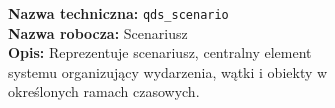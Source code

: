 \begin{figure}[H]
    \begin{minipage}{\textwidth}
        \centering

        \begin{figure}[H]
            \centering
            \begin{minipage}{0.8\textwidth}
                \begin{framed}
                    \noindent\textbf{\large Nazwa techniczna:} \texttt{qds\_scenario} \\
                    \textbf{\large Nazwa robocza:} Scenariusz \\
                    \textbf{\large Opis:} Reprezentuje scenariusz, centralny element systemu organizujący
                    wydarzenia, wątki i obiekty w określonych ramach czasowych.
                \end{framed}
            \end{minipage}
        \end{figure}



\end{minipage}
\end{figure}
